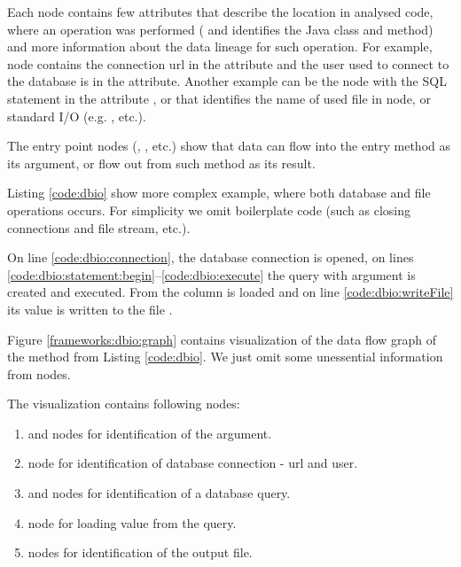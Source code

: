 Each node contains few attributes that describe the location in analysed code, where an operation was performed
( and  identifies the Java class and method)
and more information about the data lineage for such operation.
For example,  node contains the connection url in the 
attribute and the user used to connect to the database is in the  attribute.
Another example can be the  node with the SQL statement in the attribute ,
or  that identifies the name of used file in  node,
or standard I/O (e.g. , etc.).

The entry point nodes (, , etc.) show that data can flow
into the entry method as its argument, or flow out from such method as its result.

Listing \ref{code:dbio} show more complex example, where both database and file
operations occurs. For simplicity we omit boilerplate code (such as closing connections and file stream, etc.).

On line \ref{code:dbio:connection}, the database connection is opened,
on lines \ref{code:dbio:statement:begin}--\ref{code:dbio:execute} the query
with  argument is created and executed. From  the 
column is loaded and on line \ref{code:dbio:writeFile} its value is written to the file .


Figure \ref{frameworks:dbio:graph} contains visualization of the data flow graph
of the  method from Listing \ref{code:dbio}.
We just omit some unessential information from nodes.

The visualization contains following nodes:
\begin{enumerate}
  \item {} and  nodes for identification of the  argument.
  \item {} node for identification of database connection - url and user.
  \item {} and  nodes for identification of a database query.
  \item {} node for loading value from the query.
  \item {} nodes for identification of the output file.
\end{enumerate}

